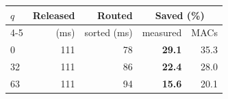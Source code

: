 \begin{tabular}{lrrrr}
\toprule
$q$ & Released & Routed & \multicolumn{2}{c}{Saved (\%)} \\
\cmidrule(lr){4-5}
 & (ms) & sorted (ms) & measured & MACs \\
\midrule
0 & 111 & 78 & \textbf{29.1} & 35.3 \\
32 & 111 & 86 & \textbf{22.4} & 28.0 \\
63 & 111 & 94 & \textbf{15.6} & 20.1 \\
\bottomrule
\end{tabular}
